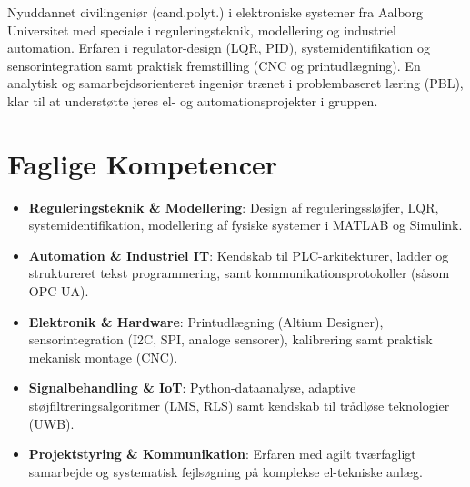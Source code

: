 \documentclass[11pt,a4paper,sans]{moderncv}
\begin{document}
\makecvtitle


\vspace{6pt}
\small{Nyuddannet civilingeniør (cand.polyt.) i elektroniske systemer fra Aalborg Universitet med speciale i reguleringsteknik, modellering og industriel automation. Erfaren i regulator-design (LQR, PID), systemidentifikation og sensorintegration samt praktisk fremstilling (CNC og printudlægning). En analytisk og samarbejdsorienteret ingeniør trænet i problembaseret læring (PBL), klar til at understøtte jeres el- og automationsprojekter i gruppen.}


\section{Faglige Kompetencer}
\vspace{1pt}
\begin{itemize}

\item \textbf{Reguleringsteknik \& Modellering}: Design af reguleringssløjfer, LQR, systemidentifikation, modellering af fysiske systemer i MATLAB og Simulink.

\item \textbf{Automation \& Industriel IT}: Kendskab til PLC-arkitekturer, ladder og struktureret tekst programmering, samt kommunikationsprotokoller (såsom OPC-UA).

\item \textbf{Elektronik \& Hardware}: Printudlægning (Altium Designer), sensorintegration (I2C, SPI, analoge sensorer), kalibrering samt praktisk mekanisk montage (CNC).

\item \textbf{Signalbehandling \& IoT}: Python-dataanalyse, adaptive støjfiltreringsalgoritmer (LMS, RLS) samt kendskab til trådløse teknologier (UWB).

\item \textbf{Projektstyring \& Kommunikation}: Erfaren med agilt tværfagligt samarbejde og systematisk fejlsøgning på komplekse el-tekniske anlæg.

\end{itemize}
\end{document}

